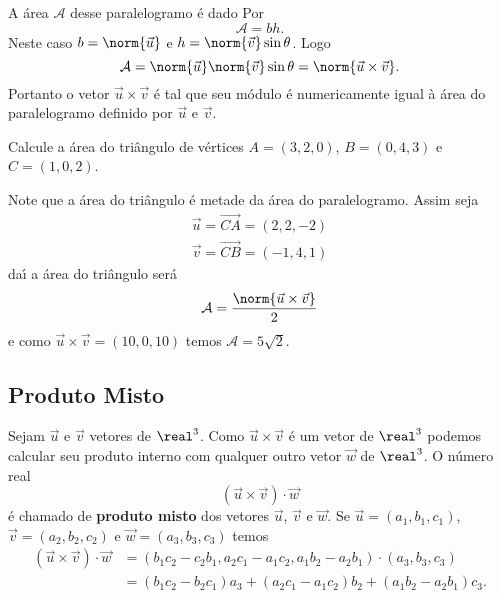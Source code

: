 A \'area $\mathcal{A}$ desse paralelogramo \'e dado Por
\[
  \mathcal{A} = bh.
\]
Neste caso $b = \norm{\vec{u}}$ e $h = \norm{\vec{v}}\sin\theta$. Logo
\[
  \mathcal{A} = \norm{\vec{u}}\norm{\vec{v}}\sin\theta = \norm{\vec{u}\times\vec{v}}.
\]
Portanto o vetor $\vec{u}\times\vec{v}$ \'e tal que seu m\'odulo \'e numericamente igual \`a \'area do paralelogramo definido por $\vec{u}$ e $\vec{v}$.
\begin{exemplo}
  Calcule a \'area do tri\^angulo de v\'ertices $A = (3,2,0)$, $B = (0,4,3)$ e $C = (1,0,2)$.
  \begin{solucao}
    Note que a \'area do tri\^angulo \'e metade da \'area do paralelogramo. Assim seja
    \begin{align*}
      \vec{u} = \vec{CA} = (2,2,-2)\\
      \vec{v} = \vec{CB} = (-1,4,1)
    \end{align*}
    da{\'\i} a \'area do tri\^angulo ser\'a
    \[
      \mathcal{A} = \dfrac{\norm{\vec{u}\times\vec{v}}}{2}
    \]
    e como $\vec{u}\times\vec{v} = (10,0,10)$ temos $\mathcal{A} = 5\sqrt{2}$.
  \end{solucao}
\end{exemplo}

\subsection{Produto Misto} %
\label{sub:produto_misto}

Sejam $\vec{u}$ e $\vec{v}$ vetores de $\real^3$. Como $\vec{u}\times\vec{v}$ \'e um vetor de $\real^3$ podemos calcular seu produto interno com qualquer outro vetor $\vec{w}$ de $\real^3$. O n\'umero real
\begin{equation}
  (\vec{u}\times\vec{v})\cdot\vec{w}
\end{equation}
\'e chamado de \textbf{produto misto} dos vetores $\vec{u}$, $\vec{v}$ e $\vec{w}$. Se $\vec{u} = (a_1,b_1,c_1)$, $\vec{v} =(a_2,b_2,c_2)$ e $\vec{w} = (a_3,b_3,c_3)$ temos
\begin{align*}
  (\vec{u}\times\vec{v})\cdot\vec{w} &= (b_1c_2 - c_2b_1,a_2c_1 - a_1c_2, a_1b_2 - a_2b_1)\cdot(a_3, b_3, c_3) \\ &= (b_1c_2 - b_2c_1)a_3 + (a_2c_1 - a_1c_2)b_2 + (a_1b_2 - a_2b_1)c_3.
\end{align*}

